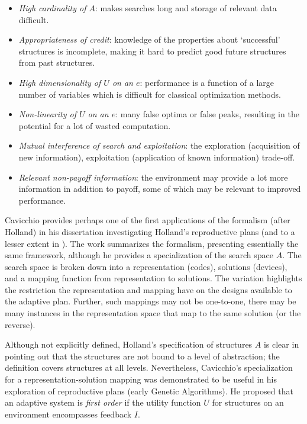 \begin{itemize}
	\item \emph{High cardinality of $A$}: makes searches long and storage of relevant data difficult.
	\item \emph{Appropriateness of credit}: knowledge of the properties about `successful' structures is incomplete, making it hard to predict good future structures from past structures.
	\item \emph{High dimensionality of $U$ on an $e$}: performance is a function of a large number of variables which is difficult for classical optimization methods.
	\item \emph{Non-linearity of $U$ on an $e$}: many false optima or false peaks, resulting in the potential for a lot of wasted computation.
	\item \emph{Mutual interference of search and exploitation}: the exploration (acquisition of new information), exploitation (application of known information) trade-off.
	\item \emph{Relevant non-payoff information}: the environment may provide a lot more information in addition to payoff, some of which may be relevant to improved performance.
\end{itemize}

Cavicchio provides perhaps one of the first applications of the formalism (after Holland) in his dissertation investigating Holland's reproductive plans \cite{Cavicchio1970} (and to a lesser extent in \cite{Cavicchio1972}). The work summarizes the formalism, presenting essentially the same framework, although he provides a specialization of the search space $A$. The search space is broken down into a representation (codes), solutions (devices), and a mapping function from representation to solutions. The variation highlights the restriction the representation and mapping have on the designs available to the adaptive plan. Further, such mappings may not be one-to-one, there may be many instances in the representation space that map to the same solution (or the reverse). 

Although not explicitly defined, Holland's specification of structures $A$ is clear in pointing out that the structures are not bound to a level of abstraction; the definition covers structures at all levels. Nevertheless, Cavicchio's specialization for a representation-solution mapping was demonstrated to be useful in his exploration of reproductive plans (early Genetic Algorithms). He proposed that an adaptive system is \emph{first order} if the utility function $U$ for structures on an environment encompasses feedback $I$.

